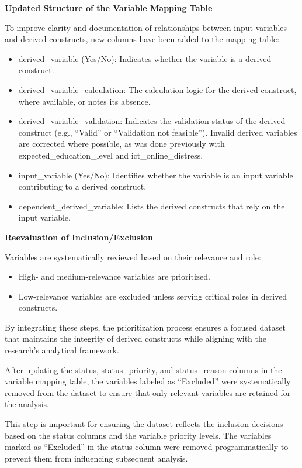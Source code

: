 \documentclass[
]{article}
\begin{document}
\textbf{Updated Structure of the Variable Mapping Table}

To improve clarity and documentation of relationships between input
variables and derived constructs, new columns have been added to the
mapping table:

\begin{itemize}
\item
  derived\_variable (Yes/No): Indicates whether the variable is a
  derived construct.
\item
  derived\_variable\_calculation: The calculation logic for the derived
  construct, where available, or notes its absence.
\item
  derived\_variable\_validation: Indicates the validation status of the
  derived construct (e.g., ``Valid'' or ``Validation not feasible'').
  Invalid derived variables are corrected where possible, as was done
  previously with expected\_education\_level and ict\_online\_distress.
\item
  input\_variable (Yes/No): Identifies whether the variable is an input
  variable contributing to a derived construct.
\item
  dependent\_derived\_variable: Lists the derived constructs that rely
  on the input variable.
\end{itemize}

\textbf{Reevaluation of Inclusion/Exclusion}

Variables are systematically reviewed based on their relevance and role:

\begin{itemize}
\item
  High- and medium-relevance variables are prioritized.
\item
  Low-relevance variables are excluded unless serving critical roles in
  derived constructs.
\end{itemize}

By integrating these steps, the prioritization process ensures a focused
dataset that maintains the integrity of derived constructs while
aligning with the research's analytical framework.

After updating the status, status\_priority, and status\_reason columns
in the variable mapping table, the variables labeled as ``Excluded''
were systematically removed from the dataset to ensure that only
relevant variables are retained for the analysis.

This step is important for ensuring the dataset reflects the inclusion
decisions based on the status columns and the variable priority levels.
The variables marked as ``Excluded'' in the status column were removed
programmatically to prevent them from influencing subsequent analysis.
\end{document}
